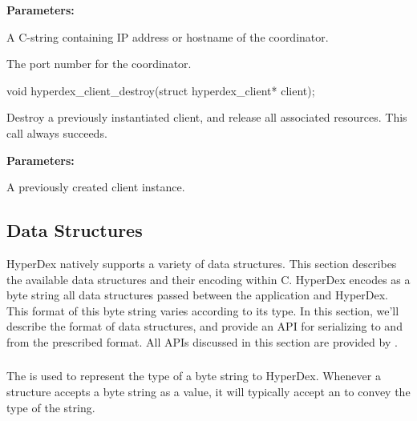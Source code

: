 \noindent\textbf{Parameters:}
\begin{description}[labelindent=\widthof{{\code{coordinator}}},leftmargin=*,noitemsep,nolistsep,align=right]
\item[\code{coordinator}] A C-string containing IP address or hostname of the
    coordinator.
\item[\code{port}] The port number for the coordinator.
\end{description}

\funcsep
\begin{ccode}
void
hyperdex_client_destroy(struct hyperdex_client* client);
\end{ccode}
\funcdesc Destroy a previously instantiated client, and release all associated
resources.  This call always succeeds.

\noindent\textbf{Parameters:}
\begin{description}[labelindent=\widthof{{\code{client}}},leftmargin=*,noitemsep,nolistsep,align=right]
\item[\code{client}] A previously created client instance.
\end{description}

\subsection{Data Structures}
\label{sec:api:c:client:data-structures}

HyperDex natively supports a variety of data structures.  This section describes
the available data structures and their encoding within C.  HyperDex encodes as
a byte string all data structures passed between the application and HyperDex.
This format of this byte string varies according to its type.  In this section,
we'll describe the format of data structures, and provide an API for serializing
to and from the prescribed format.  All APIs discussed in this section are
provided by .

\subsubsection{}
\label{sec:api:c:client:hyperdatatype}

The  is used to represent the type of a byte string to
HyperDex.  Whenever a structure accepts a byte string as a value, it will
typically accept an  to convey the type of the string.

